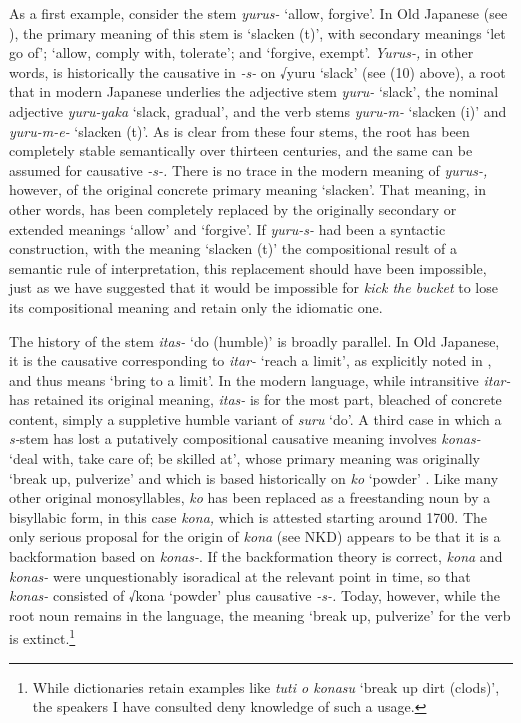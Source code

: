 \documentclass[output=paper,
modfonts
]{LSP/langsci}
\begin{document}
As a first example, consider the stem \textit{yurus-} `allow, forgive'. In
Old Japanese (see \citealp{omodaka1967a}), the primary meaning of this stem
is `slacken (t)', with secondary meanings `let go of'; `allow, comply
with, tolerate'; and `forgive, exempt'. \textit{Yurus-,} in other words,
is historically the causative in \textit{-s-} on √yuru `slack' (see (10)
above), a root that in modern Japanese underlies the adjective stem
\textit{yuru-} `slack', the nominal adjective \textit{yuru-yaka} `slack,
gradual', and the verb stems \textit{yuru-m-} `slacken (i)' and
\textit{yuru-m-e-} `slacken (t)'. As is clear from these four stems, the
root has been completely stable semantically over thirteen centuries,
and the same can be assumed for causative \textit{-s-.} There is no trace
in the modern meaning of \textit{yurus-,} however, of the original
concrete primary meaning `slacken'. That meaning, in other words, has
been completely replaced by the originally secondary or extended
meanings `allow' and `forgive'. If \textit{yuru-s-} had been a syntactic
construction, with the meaning `slacken (t)' the compositional result of
a semantic rule of interpretation, this replacement should have been
impossible, just as we have suggested that it would be impossible for
\textit{kick the bucket} to lose its compositional meaning and retain only
the idiomatic one.

The history of the stem \textit{itas-} `do (humble)' is broadly parallel.
In Old Japanese, it is the causative corresponding to \textit{itar-}
`reach a limit', as explicitly noted in \citet{omodaka1967a}, and thus
means `bring to a limit'. In the modern language, while intransitive
\textit{itar-} has retained its original meaning, \textit{itas-} is for the
most part, bleached of concrete content, simply a suppletive humble
variant of \textit{suru} `do'. A third case in which a \textit{s-}stem has
lost a putatively compositional causative meaning involves \textit{konas-}
`deal with, take care of; be skilled at', whose primary meaning was
originally `break up, pulverize' and which is based historically on
\textit{ko} `powder' \citep{ono1974a}. Like many other original monosyllables,
\textit{ko} has been replaced as a freestanding noun by a bisyllabic form,
in this case \textit{kona,} which is attested starting around 1700. The
only serious proposal for the origin of \textit{kona} (see NKD) appears to
be that it is a backformation based on \textit{konas-}. If the
backformation theory is correct, \textit{kona} and \textit{konas-} were
unquestionably isoradical at the relevant point in time, so that
\textit{konas-} consisted of √kona `powder' plus causative \textit{-s-.}
Today, however, while the root noun remains in the language, the meaning
`break up, pulverize' for the verb is extinct.\footnote{While
  dictionaries retain examples like \textit{tuti o konasu} `break up dirt
  (clods)', the speakers I have consulted deny knowledge of such a
  usage.}
\end{document}
